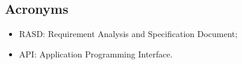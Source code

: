 \subsection{Acronyms}
	\begin{itemize}
	\item RASD: Requirement Analysis and Specification Document;
	\item API: Application Programming Interface.
	\end{itemize}